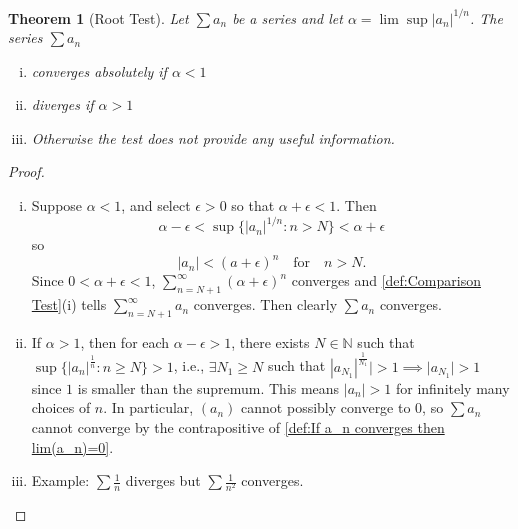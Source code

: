 \documentclass[12pt, lettersize]{book}
\theoremstyle{plain}
\newtheorem{thm}{Theorem}[section]
\theoremstyle{definition}
\theoremstyle{remark}
\newcommand{\N}{\mathbb{N}}
\begin{document}
		\begin{thm}[Root Test]\label{def:Root Test}
		Let	$\sum a_n$ be a series and let $\alpha=\lim\sup|a_n|^{1/n}$. The series $\sum a_n$
		\begin{enumerate}[(i)]
			\item converges absolutely if $\alpha<1$
			\item diverges if $\alpha>1$
			\item Otherwise the test does not provide any useful information.
		\end{enumerate}
		\end{thm}
		\begin{proof}
		\begin{enumerate}[(i)]
			\item Suppose $\alpha<1$, and select $\epsilon>0$ so that $\alpha+\epsilon<1$. Then
			\begin{displaymath}
				\alpha-\epsilon<\sup\{|a_n|^{1/n}: n>N\}<\alpha+\epsilon
			\end{displaymath}
			so
			\begin{displaymath}
				|a_n|<(a+\epsilon)^n\quad\text{for}\quad n>N.
			\end{displaymath}
			Since $0<\alpha+\epsilon<1$, $\sum_{n=N+1}^{\infty}(\alpha+\epsilon)^n$ converges and \ref{def:Comparison Test}(i) tells $\sum_{n=N+1}^{\infty}a_n$ converges. Then clearly $\sum a_n$ converges.
			\item If $\alpha>1$, then for each $\alpha-\epsilon>1$, there exists $N\in\N$ such that $\sup\{|a_n|^\frac{1}{n}: n\geq N\}>1$, i.e., $\exists N_1\geq N$ such that $|a_{N_1}|^\frac{1}{N_1}|>1\implies |a_{N_1}|>1$ since $1$ is smaller than the supremum. This means $|a_n|>1$ for infinitely many choices of $n$. In particular, $(a_n)$
			cannot possibly converge to $0$, so $\sum a_n$ cannot converge by the contrapositive of \ref{def:If a_n converges then lim(a_n)=0}.
			\item Example: $\sum\frac{1}{n}$ diverges but $\sum\frac{1}{n^2}$ converges.
		\end{enumerate}
		\end{proof}
	
\end{document}
